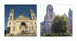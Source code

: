 \documentclass[12pt]{article}
\begin{document}
\begin{figure}[!htbp]
  \begin{minipage}[t]{0.2 \textwidth}
    \centering \includegraphics[width= \linewidth]{./figures/basilica} 
    \centering \includegraphics[width= \linewidth]{./figures/basilica2} 

\end{minipage}
\end{figure}
\end{document}
